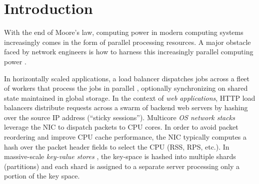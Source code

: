 \section{Introduction}\label{sec:introduction}










With the end of Moore's law, computing power in modern computing systems increasingly comes in the form of parallel processing resources.  A major obstacle faced by network engineers is how to harness this increasingly parallel computing power \cite{265065, 10.5555/3307441.3307467, 10.1145/2815400.2815423, 10.1145/3098822.3098826, 10.5555/3154630.3154639}.

In horizontally scaled applications, a load balancer dispatches jobs across a fleet of workers that process the jobs in parallel \cite{10.5555/3235491}, optionally synchronizing on shared state maintained in global storage.  In the context of \emph{web applications}, HTTP load balancers \cite{194966, 211279, 9552525} distribute requests across a swarm of backend web servers by hashing over the source IP address (``sticky sessions''). %
Multicore \emph{OS network stacks} \cite{211263, 10.1145/3359989.3365412, 10.1145/3452296.3472914} leverage the NIC to dispatch packets to CPU cores. In order to avoid packet reordering and improve CPU cache performance, the NIC typically computes a hash over the packet header fields to select the CPU (RSS, RPS, etc.).  In massive-scale \emph{key-value stores} \cite{ghigoff2021bmc}, the key-space is hashed into multiple shards (partitions) and each shard is assigned to a separate server processing only a portion of the key space.

